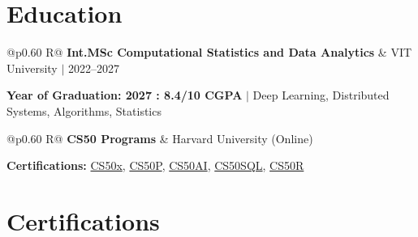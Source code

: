 \documentclass[a4paper,11pt]{article}
\newcommand{\subheading}[1]{\textbf{#1}}
\newcommand{\meta}[1]{{\fontsize{10}{12}\selectfont\textcolor[HTML]{3A3A3A}{#1}}}
\newcommand{\ulink}[2]{\href{#1}{#2}}
\begin{document}
\section{Education}
\vspace{2pt}

\begin{tabularx}{\linewidth}{@{}p{0.60\linewidth} R@{}}
\subheading{Int.MSc Computational Statistics and Data Analytics} & \meta{VIT University $|$ 2022--2027}
\end{tabularx}
{\color[HTML]{3A3A3A}\fontsize{11}{14}\selectfont \textbf{Year of Graduation: 2027 : 8.4/10 CGPA} $|$ Deep Learning, Distributed Systems, Algorithms, Statistics}

\begin{tabularx}{\linewidth}{@{}p{0.60\linewidth} R@{}}
\subheading{CS50 Programs} & \meta{Harvard University (Online)}
\end{tabularx}
{\color[HTML]{3A3A3A}\fontsize{11}{14}\selectfont \textbf{Certifications:} \ulink{https://cs50.harvard.edu/certificates/b14b78df-e05c-413e-a607-1dd27303053a}{CS50x}, \ulink{https://cs50.harvard.edu/certificates/32477052-9db4-49c4-a5a4-d7e58429ca2c}{CS50P}, \ulink{https://cs50.harvard.edu/certificates/9cdb4d4a-1250-4f8e-9fd7-191864e0f919}{CS50AI}, \ulink{https://cs50.harvard.edu/certificates/bc486f24-f085-4e61-8536-80940b97a1b9}{CS50SQL}, \ulink{https://cs50.harvard.edu/certificates/666838e6-a053-4d82-b179-a60fe745fd84}{CS50R}}

\section{Certifications}
\vspace{2pt}
\end{document}
